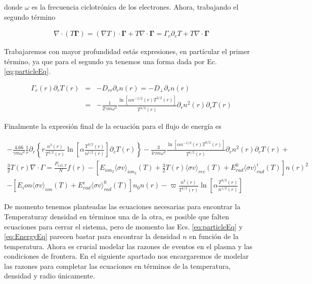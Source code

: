 donde $\omega$ es la frecuencia ciclotr\'onica de los electrones. Ahora, trabajando el segundo t\'ermino

\begin{eqnarray}
  \nabla\cdot(T\pmb{\Gamma}) = (\nabla T) \cdot \pmb{\Gamma} + T\nabla\cdot\pmb{\Gamma} = \Gamma_r\partial_r T + T\nabla\cdot{\pmb{\Gamma}}
\end{eqnarray}

Trabajaremos con mayor profundidad est\'as expresiones, en part\'icular el primer t\'ermino, ya que para el segundo ya tenemos una forma dada por Ec. \eqref{eq:particleEq}. 

\begin{eqnarray}
  \Gamma_r(r)\partial_rT(r) &=& -D_{rr}\partial_r n(r) = -D_\perp\partial_r n(r) \nonumber\\
                            &=& -\frac{1}{2\gamma m\omega^2}\frac{\ln\left[\alpha n^{-1/2}(r)T^{3/2}(r)\right]}{T^{1/2}(r)}\partial_r n^2(r)\partial_r T(r)
\end{eqnarray}

Finalmente la expresi\'on final de la ecuaci\'on para el flujo de energ\'ia es

\begin{eqnarray}
 -\frac{4.66}{\gamma m\omega^2}\frac{1}{r}\partial_r\left\{r \frac{n^2(r)}{T^{1/2}(r)}\ln\left[\alpha \frac{T^{3/2}(r)}{n^{1/2}(r)}\right] \partial_r T(r)\right\} - \frac{3}{4\gamma m\omega^2}\frac{\ln\left[\alpha n^{-1/2}(r)T^{3/2}(r)\right]}{T^{1/2}(r)}\partial_r n^2(r)\partial_r T(r) \nonumber + \nonumber\\
 \frac{3}{2}T(r)\nabla\cdot\Gamma =  \frac{P_{ext,T}}{N}f(r) -  [E_{ion_2}\langle\sigma v\rangle_{ion_2}(T) + \frac{3}{2}T(r)\langle\sigma v\rangle_{rec}(T) + E_{rad}^0\langle\sigma v\rangle_{rad}^i(T)]n(r)^2 \nonumber \\ - [E_ion\langle\sigma v\rangle_{ion}(T)+ E_{rad}^i\langle\sigma v\rangle_{rad}^0(T)]n_0n(r) - \varpi\frac{n^2(r)}{T^{1/2}(r)}\ln\left[\alpha \frac{T^{3/2}(r)}{n^{1/2}(r)}\right]\label{eq:EnergyEq}
\end{eqnarray}

De momento tenemos planteadas las ecuaciones necesarias para encontrar la Temperaturay densidad en t\'erminos una de la otra, es posible que falten ecuaciones para cerrar el sistema, pero de momento las Ecs. \eqref{eq:particleEq} y \eqref{eq:EnergyEq} parecen bastar para encontrar la densidad $n$ en funci\'on de la temperatura. Ahora es crucial modelar las razones de eventos en el plasma y las condiciones de frontera. En el siguiente apartado nos encargaremos de modelar las razones para completar las ecuaciones en t\'erminos de la temperatura, densidad y radio \'unicamente.
